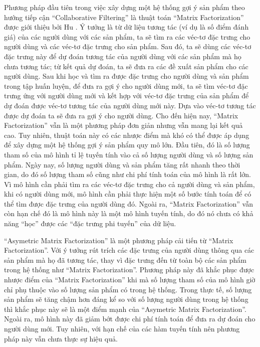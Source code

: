 Phương pháp đầu tiên trong việc xây dựng một hệ thống gợi ý sản phẩm theo hướng tiếp cận ``Collaborative Filtering'' là thuật toán ``Matrix Factorization'' được giới thiệu bởi Hu \cite{MF}. 
Ý tưởng là từ dữ liệu tương tác (ví dụ là số điểm đánh giá) của các người dùng với các sản phẩm, ta sẽ tìm ra các véc-tơ đặc trưng cho người dùng và các véc-tơ đặc trưng cho sản phẩm. 
Sau đó, ta sẽ dùng các véc-tơ đặc trưng này để dự đoán tương tác của người dùng với các sản phẩm mà họ chưa tương tác; từ kết quả dự đoán, ta sẽ đưa ra các đề xuất sản phẩm cho các người dùng.
Sau khi học và tìm ra được đặc trưng cho người dùng và sản phẩm trong tập huấn luyện, để đưa ra gợi ý cho người dùng mới, ta sẽ tìm véc-tơ đặc trưng ứng với người dùng mới và kết hợp với véc-tơ đặc trưng của sản phẩm để dự đoán được véc-tơ tương tác của người dùng mới này.
Dựa vào véc-tơ tương tác được dự đoán ta sẽ đưa ra gợi ý cho người dùng.
Cho đến hiện nay, ``Matrix Factorization'' vẫn  là một phương pháp đơn giản nhưng vẫn mang lại kết quả cao.
Tuy nhiên, thuật toán này có các nhược điểm mà khó có thể được áp dụng để xây dựng một hệ thống gợi ý sản phẩm quy mô lớn.
Đầu tiên, đó là số lượng tham số của mô hình tỉ lệ tuyến tính vào cả số lượng người dùng và số lượng sản phẩm. 
Ngày nay, số lượng người dùng và sản phẩm tăng rất nhanh theo thời gian, do đó số lượng tham số cũng như chi phí tính toán của mô hình là rất lớn.
Vì mô hình cần phải tìm ra các véc-tơ đặc trưng cho cả người dùng và sản phẩm, khi có người dùng mới, mô hình cần phải thực hiện một số bước tính toán để có thể tìm được đặc trưng của người dùng đó.
Ngoài ra, ``Matrix Factorization'' vẫn còn hạn chế đó là mô hình này là một mô hình tuyến tính, do đó nó chưa có khả năng ``học'' được các ``đặc trưng phi tuyến'' của dữ liệu.

``Asymetric Matrix Factorization'' là một phương pháp cải tiến từ ``Matrix Factorization''.
Với ý tưởng rút trích các đặc trưng của người dùng thông qua các sản phẩm mà họ đã tương tác, thay vì đặc trưng đến từ toàn bộ các sản phẩm trong hệ thống như ``Matrix Factorization''.
Phương pháp này đã khắc phục được nhược điểm của ``Matrix Factorization'' khi mà số lượng tham số của mô hình giờ chỉ phụ thuộc vào số lượng sản phẩm có trong hệ thống. 
Trong thực tế, số lượng sản phẩm sẽ tăng chậm hơn đáng kể so với số lượng người dùng trong hệ thống thì khắc phục này sẽ là một điểm mạnh của ``Asymetric Matrix Factorization''. 
Ngoài ra, mô hình này đã giảm bớt được chi phí tính toán để đưa ra dự đoán cho người dùng mới. 
Tuy nhiên, với hạn chế của các hàm tuyến tính nên phương pháp này vẫn chưa thực sự hiệu quả.

